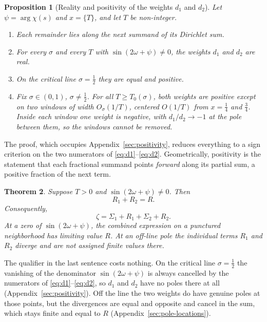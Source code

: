 \documentclass[11pt]{article}
\newtheorem{theorem}{Theorem}[section]
\newtheorem{proposition}[theorem]{Proposition}
\theoremstyle{definition}
\begin{document}
\begin{proposition}[Reality and positivity of the weights $d_1$ and $d_2$]\label{prop:weights}
Let $\psi=\arg\chi(s)$ and $x=\{T\}$, and let $T$ be
non-integer.
\begin{enumerate}
\item[(i)] Each remainder lies along the \emph{next} summand of its
Dirichlet sum.
\item[(ii)] For every $\sigma$ and every $T$ with
$\sin(2\omega+\psi)\neq0$, the weights $d_1$ and $d_2$ are real.
\item[(iii)] On the critical line $\sigma=\tfrac12$ they are equal and
positive.
\item[(iv)] Fix $\sigma\in(0,1)$, $\sigma\neq\tfrac12$. For all
$T\geq T_0(\sigma)$, both weights are positive except on two windows of
width $O_\sigma(1/T)$, centered $O(1/T)$ from $x=\tfrac14$ and
$\tfrac34$. Inside each window one weight is negative, with
$d_1/d_2\to-1$ at the pole between them, so the windows cannot be
removed.
\end{enumerate}
\end{proposition}

The proof, which occupies Appendix~\ref{sec:positivity}, reduces
everything to a sign criterion on the two numerators of
\eqref{eq:d1}--\eqref{eq:d2}.
Geometrically, positivity is the statement that each
fractional summand points \emph{forward} along its
partial sum, a positive fraction of the next term.

\begin{theorem}\label{thm:decomp}
Suppose $T>0$ and $\sin(2\omega+\psi)\neq0$. Then
\[
R_{1} + R_{2} = R.
\]
Consequently,
\[
\zeta = \Sigma_{1} + R_{1} + \Sigma_{2} + R_{2}.
\]
At a zero of $\sin(2\omega+\psi)$, the combined expression on a punctured
neighborhood has limiting value $R$. At an off-line pole the individual
terms $R_1$ and $R_2$ diverge and are not assigned finite values there.
\end{theorem}

The qualifier in the last sentence costs nothing. On the critical line
$\sigma=\tfrac12$ the vanishing of the denominator $\sin(2\omega+\psi)$ is
always cancelled by the numerators of
\eqref{eq:d1}--\eqref{eq:d2}, so $d_1$ and $d_2$ have no poles there at
all (Appendix~\ref{sec:positivity}). Off the line the two weights do have genuine
poles at those points, but the divergences are equal and opposite and
cancel in the sum, which stays finite and equal to $R$
(Appendix~\ref{sec:pole-locations}).
\end{document}
